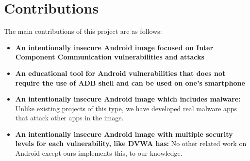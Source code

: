 	\section{Contributions} 
		\label{sec:intro_contributions} 
		
		The main contributions of this project are as follows:
		
		\begin{itemize}	
		
			\item \textbf{An intentionally insecure Android image focused on Inter Component Communication vulnerabilities and attacks}
			
			\item \textbf{An educational tool for Android vulnerabilities that does not require the use of ADB shell and can be used on one's smartphone}
			
			\item \textbf{An intentionally insecure Android image which includes malware:}
			Unlike existing projects of this type, we have developed real malware apps that attack other apps in the image.
			
			\item \textbf{An intentionally insecure Android image with multiple security levels for each vulnerability, like DVWA has:}
			No other related work on Android except ours implements this, to our knowledge.
			
		\end{itemize}